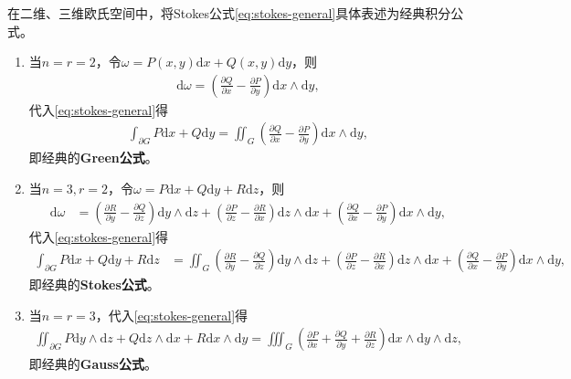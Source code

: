 \documentclass[../../main.tex]{subfiles}%
\begin{document}
\begin{example}
在二维、三维欧氏空间中，将Stokes公式\eqref{eq:stokes-general}具体表述为经典积分公式。
\end{example}
\begin{solution}
\begin{enumerate}[(1)]
\item 当$n=r=2$，令$\omega=P(x,y)\mathrm{d}x+Q(x,y)\mathrm{d}y$，则
\begin{align*}
\mathrm{d}\omega = \left(\frac{\partial Q}{\partial x}-\frac{\partial P}{\partial y}\right)\mathrm{d}x\land\mathrm{d}y,
\end{align*}
代入\eqref{eq:stokes-general}得
\begin{align*}
\int_{\partial G}P\mathrm{d}x+Q\mathrm{d}y = \iint_G\left(\frac{\partial Q}{\partial x}-\frac{\partial P}{\partial y}\right)\mathrm{d}x\land\mathrm{d}y,
\end{align*}
即经典的\textbf{Green公式}。

\item 当$n=3,r=2$，令$\omega=P\mathrm{d}x+Q\mathrm{d}y+R\mathrm{d}z$，则
\begin{align*}
\mathrm{d}\omega &= \left(\frac{\partial R}{\partial y}-\frac{\partial Q}{\partial z}\right)\mathrm{d}y\land\mathrm{d}z+\left(\frac{\partial P}{\partial z}-\frac{\partial R}{\partial x}\right)\mathrm{d}z\land\mathrm{d}x+\left(\frac{\partial Q}{\partial x}-\frac{\partial P}{\partial y}\right)\mathrm{d}x\land\mathrm{d}y,
\end{align*}
代入\eqref{eq:stokes-general}得
\begin{align*}
\int_{\partial G}P\mathrm{d}x+Q\mathrm{d}y+R\mathrm{d}z &= \iint_G\left(\frac{\partial R}{\partial y}-\frac{\partial Q}{\partial z}\right)\mathrm{d}y\land\mathrm{d}z+\left(\frac{\partial P}{\partial z}-\frac{\partial R}{\partial x}\right)\mathrm{d}z\land\mathrm{d}x+\left(\frac{\partial Q}{\partial x}-\frac{\partial P}{\partial y}\right)\mathrm{d}x\land\mathrm{d}y,
\end{align*}
即经典的\textbf{Stokes公式}。

\item 当$n=r=3$，代入\eqref{eq:stokes-general}得
\begin{align*}
\iint_{\partial G}P\mathrm{d}y\land\mathrm{d}z+Q\mathrm{d}z\land\mathrm{d}x+R\mathrm{d}x\land\mathrm{d}y = \iiint_G\left(\frac{\partial P}{\partial x}+\frac{\partial Q}{\partial y}+\frac{\partial R}{\partial z}\right)\mathrm{d}x\land\mathrm{d}y\land\mathrm{d}z,
\end{align*}
即经典的\textbf{Gauss公式}。
\end{enumerate}
\end{solution}
\end{document}
